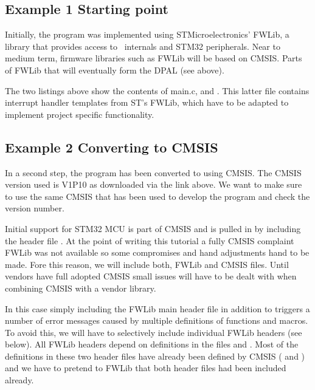 \subsection{Example 1 Starting point}

Initially, the program was implemented using STMicroelectronics’ FWLib, a
library that provides access to \ internals and STM32 peripherals. Near
to medium term, firmware libraries such as FWLib will be based on CMSIS. Parts
of FWLib that will eventually form the DPAL (see above).





The two listings above show the contents of main.c, and .
This latter file contains interrupt handler templates from ST’s FWLib, which
have to be adapted to implement project specific functionality.

\subsection{Example 2 Converting to CMSIS}

In a second step, the program has been converted to using CMSIS. The CMSIS
version used is V1P10 as downloaded via the link above. We want to make sure to
use the same CMSIS that has been used to develop the program and check the
version number.



Initial support for STM32 MCU is part of CMSIS and is pulled in by including the
header file . At the point of writing this tutorial a fully CMSIS
complaint FWLib was not available so some compromises and hand adjustments hand
to be made. Fore this reason, we will include both, FWLib and CMSIS files. Until
vendors have full adopted CMSIS small issues will have to be dealt with when
combining CMSIS with a vendor library.

In this case simply including the FWLib main header file 
in addition to  triggers a number of error messages caused by
multiple definitions of functions and macros. To avoid this, we will have to
selectively include individual FWLib headers (see below). All FWLib headers
depend on definitions in the files  and
. Most of the definitions in these two header files have
already been defined by CMSIS ( and )
and we have to pretend to FWLib that both header files had been included already.

